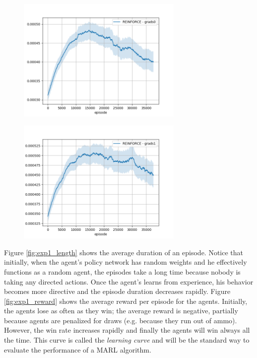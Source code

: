\begin{figure}
\centering
\begin{minipage}{.5\textwidth}
  \centering
  \includegraphics[width=8cm]{images/experiment4/grad0.png}
  \label{fig:exp1_grad0}
\end{minipage}%
\begin{minipage}{.5\textwidth}
  \centering
  \includegraphics[width=8cm]{images/experiment4/grad1.png}
  \label{fig:exp1_grad1}
\end{minipage}
\end{figure}

Figure \ref{fig:exp1_length} shows the average duration of an episode. Notice that initially, when the agent's policy network has random weights and he effectively functions as a random agent, the episodes take a long time because nobody is taking any directed actions. Once the agent's learns from experience, his behavior becomes more directive and the episode duration decreases rapidly. Figure \ref{fig:exp1_reward} shows the average reward per episode for the agents. Initially, the agents lose as often as they win; the average reward is negative, partially because agents are penalized for draws (e.g. because they run out of ammo). However, the win rate increases rapidly and finally the agents will win always all the time. This curve is called the \emph{learning curve} and will be the standard way to evaluate the performance of a MARL algorithm.\\


